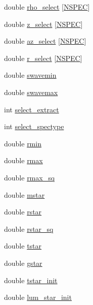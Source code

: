 \begin{DoxyCompactItemize}
\item 
double \hyperlink{structgeometry_ad91f1041aaf45a72a4d2c67de476848f}{rho\+\_\+select} \mbox{[}\hyperlink{python_8h_ade1df1cb82ae4ef9a5c0cddb37d9a73b}{N\+S\+P\+EC}\mbox{]}
\item 
double \hyperlink{structgeometry_aea2042fe2011ace4827d2b0e0792168d}{z\+\_\+select} \mbox{[}\hyperlink{python_8h_ade1df1cb82ae4ef9a5c0cddb37d9a73b}{N\+S\+P\+EC}\mbox{]}
\item 
double \hyperlink{structgeometry_a8c012380cab384d943962d3c36bdab4f}{az\+\_\+select} \mbox{[}\hyperlink{python_8h_ade1df1cb82ae4ef9a5c0cddb37d9a73b}{N\+S\+P\+EC}\mbox{]}
\item 
double \hyperlink{structgeometry_adf45001b1836a0566cf25d9151b0906d}{r\+\_\+select} \mbox{[}\hyperlink{python_8h_ade1df1cb82ae4ef9a5c0cddb37d9a73b}{N\+S\+P\+EC}\mbox{]}
\item 
double \hyperlink{structgeometry_abc10c324e776f2bf8c809096402ecb75}{swavemin}
\item 
double \hyperlink{structgeometry_a140530983e750dba228f9cd27d12000f}{swavemax}
\item 
int \hyperlink{structgeometry_ab8605990f1d7f0862abaf18f1c701045}{select\+\_\+extract}
\item 
int \hyperlink{structgeometry_a384632d687a144af30856d0c8d96f01c}{select\+\_\+spectype}
\item 
double \hyperlink{structgeometry_a85ec3f4bef73b748bc3f0e3f828a821f}{rmin}
\item 
double \hyperlink{structgeometry_a7e0e317f07c82f819badcb1cfc4fc478}{rmax}
\item 
double \hyperlink{structgeometry_a3cc932b452e5ef95290b078dc39f0c50}{rmax\+\_\+sq}
\item 
double \hyperlink{structgeometry_a0a526c9353a39b2f27f1edfdcb808384}{mstar}
\item 
double \hyperlink{structgeometry_a7384383e4129a0341c5a1a27a68d7947}{rstar}
\item 
double \hyperlink{structgeometry_a13ebfaefe1ef2d771f3f0a2277d74617}{rstar\+\_\+sq}
\item 
double \hyperlink{structgeometry_a616dab8404be7333cecb406cd354d906}{tstar}
\item 
double \hyperlink{structgeometry_a798697d796c9644b8785ba1e96337331}{gstar}
\item 
double \hyperlink{structgeometry_aa2d4d03230671a423ed0d287bc6c936d}{tstar\+\_\+init}
\item 
double \hyperlink{structgeometry_af3918bcc7ecbc5ca9a62a987a8871300}{lum\+\_\+star\+\_\+init}

\end{DoxyCompactItemize}

